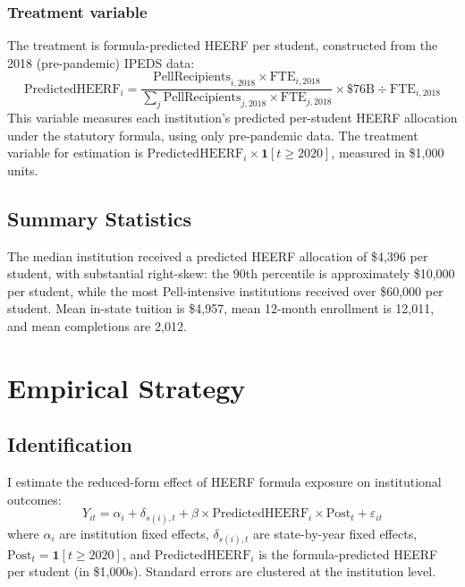 \documentclass[12pt]{article}
\begin{document}
\subsubsection*{Treatment variable} The treatment is formula-predicted HEERF per student, constructed from the 2018 (pre-pandemic) IPEDS data:
\begin{equation}
\text{PredictedHEERF}_i = \frac{\text{PellRecipients}_{i,2018} \times \text{FTE}_{i,2018}}{\sum_j \text{PellRecipients}_{j,2018} \times \text{FTE}_{j,2018}} \times \$76\text{B} \div \text{FTE}_{i,2018}
\end{equation}
This variable measures each institution's predicted per-student HEERF allocation under the statutory formula, using only pre-pandemic data. The treatment variable for estimation is $\text{PredictedHEERF}_i \times \mathbf{1}[t \geq 2020]$, measured in \$1,000 units.

\subsection{Summary Statistics}



The median institution received a predicted HEERF allocation of \$4,396 per student, with substantial right-skew: the 90th percentile is approximately \$10,000 per student, while the most Pell-intensive institutions received over \$60,000 per student. Mean in-state tuition is \$4,957, mean 12-month enrollment is 12,011, and mean completions are 2,012.

\section{Empirical Strategy}

\subsection{Identification}

I estimate the reduced-form effect of HEERF formula exposure on institutional outcomes:
\begin{equation}
Y_{it} = \alpha_i + \delta_{s(i),t} + \beta \times \text{PredictedHEERF}_i \times \text{Post}_t + \varepsilon_{it}
\label{eq:main}
\end{equation}
where $\alpha_i$ are institution fixed effects, $\delta_{s(i),t}$ are state-by-year fixed effects, $\text{Post}_t = \mathbf{1}[t \geq 2020]$, and $\text{PredictedHEERF}_i$ is the formula-predicted HEERF per student (in \$1,000s). Standard errors are clustered at the institution level.
\end{document}
